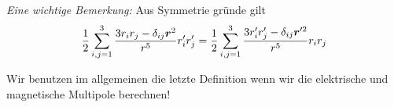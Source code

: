     \textit{Eine wichtige Bemerkung:}
    Aus Symmetrie gründe gilt
    \begin{equation*}
      \frac{1}{2}\sum_{i,j=1}^3 \frac{3r_ir_j-\delta_{ij}\vb*r^2}{r^5}
      r_i'r_j'
      =
      \frac{1}{2}\sum_{i,j=1}^3 \frac{3r'_ir'_j-\delta_{ij}\vb*r'^2}{r^5}
      r_ir_j
    \end{equation*}
    
    Wir benutzen im allgemeinen die letzte Definition wenn wir die
    elektrische und magnetische Multipole berechnen!
    


